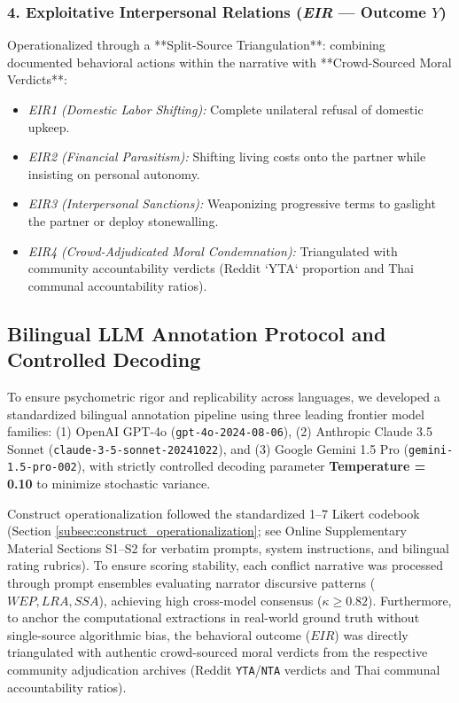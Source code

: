 \subsubsection{4. Exploitative Interpersonal Relations (\textit{EIR} --- Outcome $Y$)}
Operationalized through a **Split-Source Triangulation**: combining documented behavioral actions within the narrative with **Crowd-Sourced Moral Verdicts**:
\begin{itemize}[leftmargin=*]
    \item \textit{EIR1 (Domestic Labor Shifting):} Complete unilateral refusal of domestic upkeep.
    \item \textit{EIR2 (Financial Parasitism):} Shifting living costs onto the partner while insisting on personal autonomy.
    \item \textit{EIR3 (Interpersonal Sanctions):} Weaponizing progressive terms to gaslight the partner or deploy stonewalling.
    \item \textit{EIR4 (Crowd-Adjudicated Moral Condemnation):} Triangulated with community accountability verdicts (Reddit `YTA` proportion and Thai communal accountability ratios).
\end{itemize}

\subsection{Bilingual LLM Annotation Protocol and Controlled Decoding}
To ensure psychometric rigor and replicability across languages, we developed a standardized bilingual annotation pipeline using three leading frontier model families: (1) OpenAI GPT-4o (\texttt{gpt-4o-2024-08-06}), (2) Anthropic Claude 3.5 Sonnet (\texttt{claude-3-5-sonnet-20241022}), and (3) Google Gemini 1.5 Pro (\texttt{gemini-1.5-pro-002}), with strictly controlled decoding parameter \textbf{Temperature = 0.10} to minimize stochastic variance.

Construct operationalization followed the standardized 1--7 Likert codebook (Section \ref{subsec:construct_operationalization}; see Online Supplementary Material Sections S1--S2 for verbatim prompts, system instructions, and bilingual rating rubrics). To ensure scoring stability, each conflict narrative was processed through prompt ensembles evaluating narrator discursive patterns ($WEP, LRA, SSA$), achieving high cross-model consensus ($\kappa \ge 0.82$). Furthermore, to anchor the computational extractions in real-world ground truth without single-source algorithmic bias, the behavioral outcome ($EIR$) was directly triangulated with authentic crowd-sourced moral verdicts from the respective community adjudication archives (Reddit \texttt{YTA}/\texttt{NTA} verdicts and Thai communal accountability ratios).

